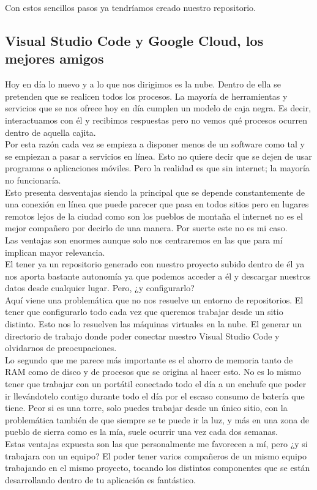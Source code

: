 Con estos sencillos pasos ya tendríamos creado nuestro repositorio.

\subsection{Visual Studio Code y Google Cloud, los mejores amigos}
Hoy en día lo nuevo y a lo que nos dirigimos es la nube. Dentro de ella se pretenden que se realicen todos los procesos. La mayoría de herramientas y servicios que se nos ofrece hoy en día cumplen un modelo de caja negra. Es decir, interactuamos con él y recibimos respuestas pero no vemos qué procesos ocurren dentro de aquella cajita.
\\Por esta razón cada vez se empieza a disponer menos de un software como tal y se empiezan a pasar a servicios en línea. Esto no quiere decir que se dejen de usar programas o aplicaciones móviles. Pero la realidad es que sin internet; la mayoría no funcionaría.
\\Esto presenta desventajas siendo la principal que se depende constantemente de una conexión en línea que puede parecer que pasa en todos sitios pero en lugares remotos lejos de la ciudad como son los pueblos de montaña el internet no es el mejor compañero por decirlo de una manera. Por suerte este no es mi caso.
\\Las ventajas son enormes aunque solo nos centraremos en las que para mí implican mayor relevancia.
\\El tener ya un repositorio generado con nuestro proyecto subido dentro de él ya nos aporta bastante autonomía ya que podemos acceder a él y descargar nuestros datos desde cualquier lugar. Pero, ¿y configurarlo?
\\Aquí viene una problemática que no nos resuelve un entorno de repositorios. El tener que configurarlo todo cada vez que queremos trabajar desde un sitio distinto. Esto nos lo resuelven las máquinas virtuales en la nube. El generar un directorio de trabajo donde poder conectar nuestro Visual Studio Code y olvidarnos de preocupaciones.
\\Lo segundo que me parece más importante es el ahorro de memoria tanto de RAM como de disco y de procesos que se origina al hacer esto. No es lo mismo tener que trabajar con un portátil conectado todo el día a un enchufe que poder ir llevándotelo contigo durante todo el día por el escaso consumo de batería que tiene. Peor si es una torre, solo puedes trabajar desde un único sitio, con la problemática también de que siempre se te puede ir la luz, y más en una zona de pueblo de sierra como es la mía, suele ocurrir una vez cada dos semanas.
\\Estas ventajas expuesta son las que personalmente me favorecen a mí, pero ¿y si trabajara con un equipo? El poder tener varios compañeros de un mismo equipo trabajando en el mismo proyecto, tocando los distintos componentes que se están desarrollando dentro de tu aplicación es fantástico.

